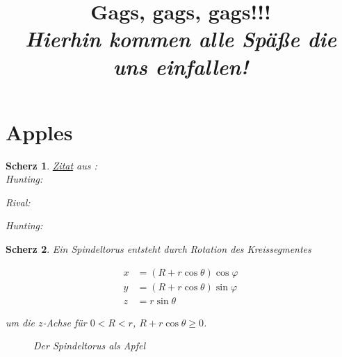 \documentclass{article}
\title
{
  Gags, gags, gags!!! \\
  \vspace{4pt}
  \normalsize
  \textit{Hierhin kommen alle Späße die uns einfallen!}
}
\author{}
\date{}
\newtheorem{gag}{Scherz}[section]
\begin{document}
\maketitle

\section{Apples}

\begin{gag}

  \href{https://knowyourphrase.com/how-do-you-like-them-apples}{Zitat} aus : \\

  Hunting:

  Rival:

  Hunting:

\end{gag}

\begin{gag}

  Ein \textit{Spindeltorus} entsteht durch Rotation des Kreissegmentes

  \begin{align*}
    x & = (R + r \cos{\theta}) \cos{\varphi} \\
    y & = (R + r \cos{\theta}) \sin{\varphi} \\
    z & = r \sin{\theta}
  \end{align*}

  um die $z$-Achse für $0 < R < r$, $R + r \cos{\theta} \geq 0$.

  \begin{figure}[H]
    \centering
    \hspace{0mm}
    \caption{Der Spindeltorus als Apfel}
    \label{fig:apfel_apple}
  \end{figure}

\end{gag}
\end{document}
